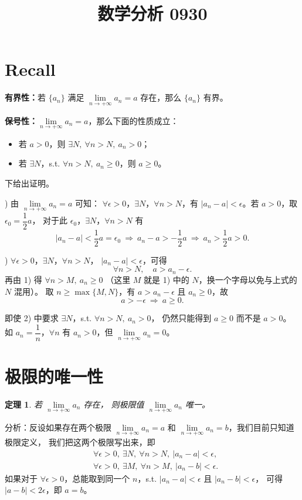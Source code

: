 \documentclass[UTF8,11pt]{ctexart}
\title{数学分析 0930}
\date{}
\theoremstyle{cnthm}
\newtheorem{thm}{定理}[section]
\begin{document}
\maketitle

\section{Recall}

\textbf{有界性：}\quad 若 $\{a_n\}$ 满足
$\lim\limits_{n\to+\infty}a_n=a$ 存在，那么 $\{a_n\}$ 有界。

\textbf{保号性：}\quad $\lim\limits_{n\to+\infty}a_n=a$，那么下面的性质成立：

\begin{itemize}
\item 若 $a>0$，则 $\exists N,\ \forall n>N,\ a_n>0$；
\item 若 $\exists N$，s.t. $\forall n>N,\ a_n\geq0$，则 $a\geq0$。
\end{itemize}

下给出证明。

) 由 $\lim\limits_{n\to+\infty}a_n=a$ 可知：
$\forall\epsilon>0$，$\exists N$，$\forall n>N$，有
$|a_n-a|<\epsilon$。若 $a>0$，取 $\epsilon_0=\dfrac12a$，
对于此 $\epsilon_0$，$\exists N$，$\forall n>N$ 有
\[
|a_n-a|<\frac12a=\epsilon_0
\ \Longrightarrow\
a_n-a>-\frac12a
\ \Longrightarrow\
a_n>\frac12a>0 .
\]

) $\forall\epsilon>0$，$\exists N$，$\forall n>N$，
$|a_n-a|<\epsilon$，可得
\[
\forall n>N,\quad a>a_n-\epsilon .
\]
再由 1) 得 $\forall n>M,\ a_n\geq0$
（这里 $M$ 就是 1) 中的 $N$，换一个字母以免与上式的 $N$ 混用）。
取 $n\geq\max\{M,N\}$，有 $a>a_n-\epsilon$ 且 $a_n\geq0$，故
\[
a>-\epsilon\ \Longrightarrow\ a\geq0 .
\]

即使 2) 中要求 $\exists N$，s.t. $\forall n>N,\ a_n>0$，
仍然只能得到 $a\geq0$ 而不是 $a>0$。
如 $a_n=\dfrac1n$，$\forall n$ 有 $a_n>0$，但
$\lim\limits_{n\to+\infty}a_n=0$。

\section{极限的唯一性}

\begin{thm}
若 $\lim\limits_{n\to+\infty}a_n$ 存在，
则极限值 $\lim\limits_{n\to+\infty}a_n$ 唯一。
\end{thm}

分析：反设如果存在两个极限
$\lim\limits_{n\to+\infty}a_n=a$ 和
$\lim\limits_{n\to+\infty}a_n=b$，我们目前只知道极限定义，
我们把这两个极限写出来，即
\begin{align*}
&\forall\epsilon>0,\ \exists N,\ \forall n>N,\ |a_n-a|<\epsilon,\\
&\forall\epsilon>0,\ \exists M,\ \forall n>M,\ |a_n-b|<\epsilon .
\end{align*}
如果对于 $\forall\epsilon>0$，总能取到同一个 $n$，s.t.
$|a_n-a|<\epsilon$ 且 $|a_n-b|<\epsilon$，
可得 $|a-b|<2\epsilon$，即 $a=b$。
\end{document}
